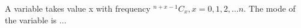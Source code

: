 \iffalse
\title{Assignment 2}
\author{AI24BTECH11014 - Charitha Sri}
\section{fitb}
\fi

	
	\item A variable takes value x with frequency ${}^{n+x-1}C_{x},
		x=0,1,2,\dots n$. The mode of the variable is $\dots$
		\hfill{}


